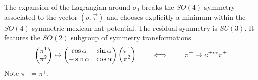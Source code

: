 The expansion of the Lagrangian around $\sigma_0$ breaks the $SO(4)$-symmetry associated to the vector $(\sigma,\vec{\pi})$ and chooses explicitly a minimum within the $SO(4)$-symmetric mexican hat potential. The residual symmetry is $SU(3)$. It features the $SO(2)$ subgroup of symmetry transformations
\begin{equation}
    \begin{pmatrix}
        \pi^1\\\pi^2
    \end{pmatrix}
        \mapsto
        \begin{pmatrix}
            \cos\alpha&\sin\alpha\\-\sin\alpha&\cos\alpha
        \end{pmatrix}
        \begin{pmatrix}
            \pi^1\\\pi^2
        \end{pmatrix}
        \qquad\iff\qquad\pi^\pm\mapsto e^{\pm{i}\alpha}\pi^\pm
\end{equation}
Note $\pi^-=\overline{\pi^+}$.

